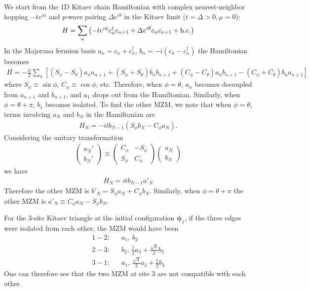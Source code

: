 \documentclass[aps,prb,showpacs,amsmath,amssymb,superscriptaddress]{revtex4-2}
\begin{document}
We start from the 1D Kitaev chain Hamiltonian with complex nearest-neighbor hopping $-te^{i\phi}$ and $p$-wave pairing $\Delta e^{i\theta}$ in the Kitaev limit ($t=\Delta > 0, \mu = 0$):
\begin{eqnarray}
	H = \sum_{n}\left(- te^{i\phi}c_n^\dag c_{n+1} + \Delta e^{i\theta}c_nc_{n+1} + {\rm h.c.}\right)
\end{eqnarray}
In the Majorana fermion basis $a_n = c_n + c_n^\dag$, $b_n = -i(c_n - c_n^\dag)$ the Hamiltonian becomes
\begin{eqnarray}
H = -\frac{it}{2} \sum_n \left[(S_\phi - S_\theta) a_n a_{n+1} + (S_\phi + S_\theta)b_n b_{n+1} + (C_\phi - C_\theta) a_n b_{n+1} - (C_\phi + C_\theta)b_na_{n+1}\right]
\end{eqnarray}
where $S_\phi\equiv \sin\phi$, $C_\phi\equiv \cos\phi$, etc. Therefore, when $\phi = \theta$, $a_n$ becomes decoupled from $a_{n+1}$ and $b_{n+1}$, and $a_1$ drops out from the Hamiltonian. Similarly, when $\phi = \theta + \pi$, $b_1$ becomes isolated. To find the other MZM, we note that when $\phi = \theta$, terms involving $a_{N}$ and $b_N$ in the Hamiltonian are
\begin{eqnarray}
	H_N = -itb_{N-1}(S_\phi b_{N} - C_\phi a_N).
\end{eqnarray}
Considering the unitary transformation
\begin{eqnarray}
	\begin{pmatrix}
		a_N' \\
		b_N'
	\end{pmatrix} \equiv\begin{pmatrix}
	C_\phi & - S_\phi\\
	S_\phi & C_\phi 
\end{pmatrix}\begin{pmatrix}
a_N\\
b_N
\end{pmatrix}
\end{eqnarray}
we have 
\begin{eqnarray}
	H_N = itb_{N-1} a'_N
\end{eqnarray}
Therefore the other MZM is $b'_N = S_\phi a_N + C_\phi b_N$. Similarly, when $\phi = \theta + \pi$ the other MZM is $a'_{N} \equiv C_\phi a_N - S_\phi b_N$. 

For the 3-site Kitaev triangle at the initial configuration $\boldsymbol{\phi}_1$, if the three edges were isolated from each other, the MZM would have been
\begin{eqnarray}
	1-2:&& a_1,\,b_2\\\nonumber
	2-3:&& b_2,\,\frac{1}{2}a_3 + \frac{\sqrt{3}}{2}b_3\\\nonumber
	3-1:&& a_1,\, \frac{\sqrt{3}}{2}a_3 + \frac{1}{2} b_3
\end{eqnarray}
One can therefore see that the two MZM at site 3 are not compatible with each other. 
\end{document}
